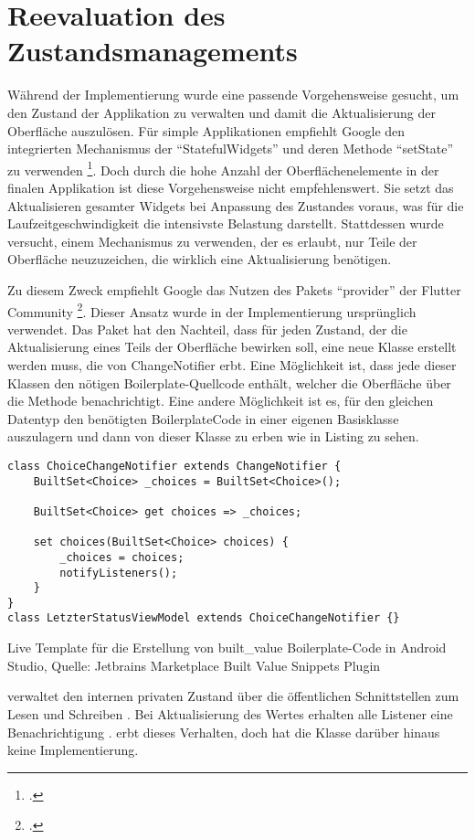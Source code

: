  
\section{Reevaluation des Zustandsmanagements}
\label{sec:Reevaluation-des-Zustandsmanagements}


Während der Implementierung wurde eine passende Vorgehensweise gesucht,
um den Zustand der Applikation zu verwalten
und damit die Aktualisierung der Oberfläche auszulösen.
Für simple Applikationen empfiehlt Google den integrierten Mechanismus der \enquote{StatefulWidgets} und deren Methode \enquote{setState} zu verwenden \footcite[Vgl.][]{AddingInteractivityToYourFlutterApp}.
Doch durch die hohe Anzahl der Oberflächenelemente in der finalen Applikation ist diese Vorgehensweise nicht empfehlenswert.
Sie setzt das Aktualisieren gesamter Widgets bei Anpassung des Zustandes voraus,
was für die Laufzeitgeschwindigkeit die intensivste Belastung darstellt.
Stattdessen wurde versucht,
einem Mechanismus zu verwenden,
der es erlaubt,
nur Teile der Oberfläche neuzuzeichen,
die wirklich eine Aktualisierung benötigen.

Zu diesem Zweck empfiehlt Google das Nutzen des Pakets \enquote{provider} der Flutter Community \footcite[Vgl.][]{ProviderARecommendedApproach}.
Dieser Ansatz wurde in der Implementierung ursprünglich verwendet.
Das Paket hat den Nachteil,
dass für jeden Zustand,
der die Aktualisierung eines Teils der Oberfläche bewirken soll,
eine neue Klasse erstellt werden muss, die von ChangeNotifier erbt.
Eine Möglichkeit ist,
dass jede dieser Klassen den nötigen Boilerplate-Quellcode enthält,
welcher die Oberfläche über die Methode  benachrichtigt.
Eine andere Möglichkeit ist es, für den gleichen Datentyp den benötigten BoilerplateCode in einer eigenen Basisklasse auszulagern
und dann von dieser Klasse zu erben wie in Listing \label{lst:ChoiceChangeNotifier} zu sehen.
\ifIncludeFigures
  \begin{listing}[h]
    \begin{verbatim}
class ChoiceChangeNotifier extends ChangeNotifier {
    BuiltSet<Choice> _choices = BuiltSet<Choice>();

    BuiltSet<Choice> get choices => _choices;

    set choices(BuiltSet<Choice> choices) {
        _choices = choices;
        notifyListeners();
    }
}
class LetzterStatusViewModel extends ChoiceChangeNotifier {}
\end{verbatim}
    \caption[built_value Live Template]{Live Template für die Erstellung von built_value Boilerplate-Code in Android Studio, Quelle: Jetbrains Marketplace Built Value Snippets Plugin}
    \label{lst:ChoiceChangeNotifier}
  \end{listing}
\fi
{} verwaltet den internen privaten Zustand   über die öffentlichen Schnittstellen zum Lesen  und Schreiben .
Bei Aktualisierung des Wertes erhalten alle Listener eine Benachrichtigung .
 erbt dieses Verhalten, doch hat die Klasse darüber hinaus keine Implementierung.

